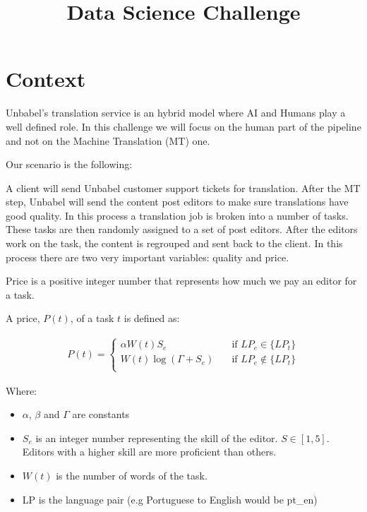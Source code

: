 \documentclass[]{extarticle}
\title{Data Science Challenge}
\begin{document}
\maketitle

\section{Context}

Unbabel's translation service is an hybrid model where AI and Humans play a well defined role. 
In this challenge we will focus on the human part of the pipeline and not on the Machine Translation (MT) one.

Our scenario is the following:

A client will send Unbabel customer support tickets for translation. After the MT step, Unbabel will send the content post editors to make sure translations have good quality. In this process a translation job is broken into a number of tasks. These tasks are then randomly assigned to a set of post editors. After the editors work on the task, the content is regrouped and sent back to the client. In this process there are two very important variables: quality and price.

Price is a positive integer number that represents how much we pay an editor for a task.

A price, $P(t)$, of a task $t$ is defined as:

\begin{align}
P(t) =
  \begin{cases}
    \alpha W(t)  S_e       & \quad \text{if } LP_e \in \{LP_t\}  \\
    W(t) \log(\Gamma + S_e)        & \quad \text{if } LP_e \notin \{LP_t\}  \\
  \end{cases}
\end{align}


Where:

\begin{itemize}
\item $\alpha$, $\beta$ and $\Gamma$ are constants
\item $S_e$ is an integer number representing the skill of the editor. $S \in [1,5]$. Editors with a higher skill are more proficient than others.
\item $W(t)$ is the number of words of the task.
\item LP is the language pair (e.g Portuguese to English would be pt\_en)
\end{itemize}
\end{document}
